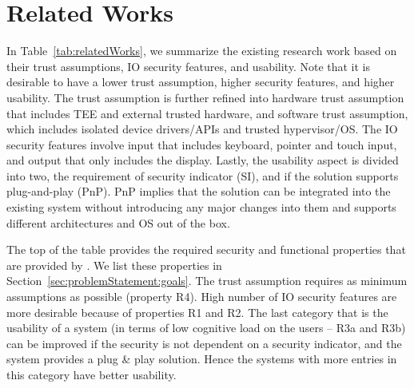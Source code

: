 
\section{Related Works}
\label{sec:relatedWorks}

In Table~\ref{tab:relatedWorks}, we summarize the existing research work based on their trust assumptions, IO security features, and usability. Note that it is desirable to have a lower trust assumption, higher security features, and higher usability. The trust assumption is further refined into hardware trust assumption that includes TEE and external trusted hardware, and software trust assumption, which includes isolated device drivers/APIs and trusted hypervisor/OS. The IO security features involve input that includes keyboard, pointer and touch input, and output that only includes the display. Lastly, the usability aspect is divided into two, the requirement of security indicator (SI), and if the solution supports plug-and-play (PnP). PnP implies that the solution can be integrated into the existing system without introducing any major changes into them and supports different architectures and OS out of the box.

\parasave
{} The top of the table provides the required security and functional properties that are provided by \name. We list these properties in Section~\ref{sec:problemStatement:goals}. The trust assumption requires as minimum assumptions as possible (property R4). High number of IO security features are more desirable because of properties R1 and R2. The last category that is the usability of a system (in terms of low cognitive load on the users -- R3a and R3b) can be improved if the security is not dependent on a security indicator, and the system provides a plug \& play solution. Hence the systems with more entries in this category have better usability.  





